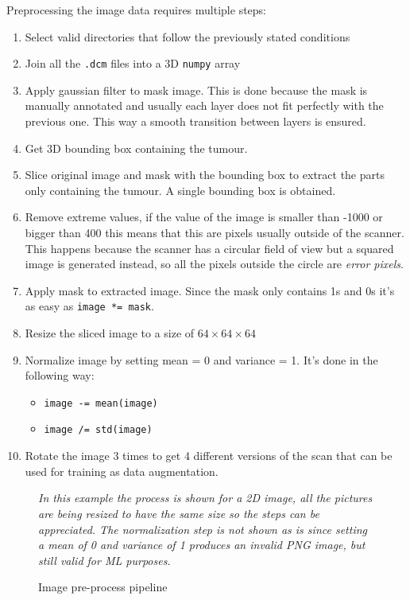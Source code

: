 Preprocessing the image data requires multiple steps:
\begin{enumerate}
  \item Select valid directories that follow the previously stated conditions
  \item Join all the \verb|.dcm| files into a 3D \verb|numpy| array
  \item Apply gaussian filter to mask image. This is done because the mask is manually annotated
        and usually each layer does not fit perfectly with the previous one. This way a smooth
        transition between layers is ensured.
  \item Get 3D bounding box containing the tumour.
  \item Slice original image and mask with the bounding box to extract the parts only containing
        the tumour. A single bounding box is obtained.
  \item Remove extreme values, if the value of the image is smaller than -1000 or bigger than
        400 this means that this are pixels usually outside of the scanner. This happens because
        the scanner has a circular field of view but a squared image is generated instead, so 
        all the pixels outside the circle are \emph{error pixels}.
  \item Apply mask to extracted image. Since the mask only contains 1s and 0s it's as easy 
        as \verb|image *= mask|.
  \item Resize the sliced image to a size of \( 64 \times 64 \times 64 \)
  \item Normalize image by setting mean = 0 and variance = 1. It's done in the following way:
  \begin{itemize}
    \item \verb|image -= mean(image)|
    \item \verb|image /= std(image)|
  \end{itemize}
  \item Rotate the image 3 times to get 4 different versions of the scan that can be used for 
        training as data augmentation.
\end{enumerate}

\begin{figure}
  \resizebox{\textwidth}{.7\textwidth}{
    
  }

  \caption{Image pre-process pipeline \label{fig:preprocess}}

  \itshape\justify
  In this example the process is shown for a 2D image, all the pictures are being resized to 
  have the same size so the steps can be appreciated. The normalization step is not shown as is
  since setting a mean of 0 and variance of 1 produces an invalid \acrshort{PNG} image, but still valid
  for \gls{ML} purposes.
\end{figure}

